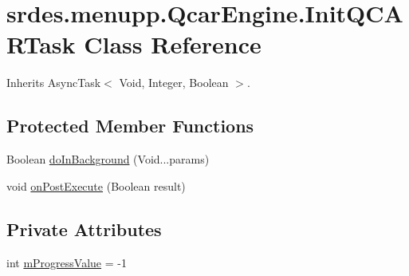 \hypertarget{classsrdes_1_1menupp_1_1_qcar_engine_1_1_init_q_c_a_r_task}{\section{srdes.\-menupp.\-Qcar\-Engine.\-Init\-Q\-C\-A\-R\-Task \-Class \-Reference}
\label{classsrdes_1_1menupp_1_1_qcar_engine_1_1_init_q_c_a_r_task}
}


\-Inherits \-Async\-Task$<$ Void, Integer, Boolean $>$.

\subsection*{\-Protected \-Member \-Functions}
\begin{DoxyCompactItemize}
\item 
\-Boolean \hyperlink{classsrdes_1_1menupp_1_1_qcar_engine_1_1_init_q_c_a_r_task_a4f04fbbb08e374da06fcafc17636754d}{do\-In\-Background} (\-Void...\-params)
\item 
void \hyperlink{classsrdes_1_1menupp_1_1_qcar_engine_1_1_init_q_c_a_r_task_a41f2f23e3562ffe44909d400f47163cf}{on\-Post\-Execute} (\-Boolean result)
\end{DoxyCompactItemize}
\subsection*{\-Private \-Attributes}
\begin{DoxyCompactItemize}
\item 
int \hyperlink{classsrdes_1_1menupp_1_1_qcar_engine_1_1_init_q_c_a_r_task_a187824f4d7a34a0adc0ee87f2267fef3}{m\-Progress\-Value} = -\/1
\end{DoxyCompactItemize}


